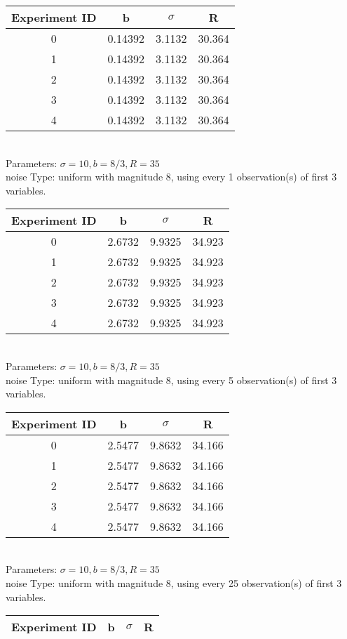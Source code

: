 \begin{multicols}{3}
\begin{tabular}{cccc}
\hline Experiment ID & b & $\sigma$ & R \\ \hline 
0 & 0.14392 & 3.1132 & 30.364\\ \hline 
 1 & 0.14392 & 3.1132 & 30.364\\ \hline 
 2 & 0.14392 & 3.1132 & 30.364\\ \hline 
 3 & 0.14392 & 3.1132 & 30.364\\ \hline 
 4 & 0.14392 & 3.1132 & 30.364\\ \hline 
 \end{tabular}\\
Parameters: $\sigma=10, b=8/3, R=35$\\
noise Type: uniform with magnitude 8, using every 1 observation(s) of first 3 variables.\\
\begin{tabular}{cccc}
\hline Experiment ID & b & $\sigma$ & R \\ \hline 
0 & 2.6732 & 9.9325 & 34.923\\ \hline 
 1 & 2.6732 & 9.9325 & 34.923\\ \hline 
 2 & 2.6732 & 9.9325 & 34.923\\ \hline 
 3 & 2.6732 & 9.9325 & 34.923\\ \hline 
 4 & 2.6732 & 9.9325 & 34.923\\ \hline 
 \end{tabular}\\
Parameters: $\sigma=10, b=8/3, R=35$\\
noise Type: uniform with magnitude 8, using every 5 observation(s) of first 3 variables.\\
\begin{tabular}{cccc}
\hline Experiment ID & b & $\sigma$ & R \\ \hline 
0 & 2.5477 & 9.8632 & 34.166\\ \hline 
 1 & 2.5477 & 9.8632 & 34.166\\ \hline 
 2 & 2.5477 & 9.8632 & 34.166\\ \hline 
 3 & 2.5477 & 9.8632 & 34.166\\ \hline 
 4 & 2.5477 & 9.8632 & 34.166\\ \hline 
 \end{tabular}\\
Parameters: $\sigma=10, b=8/3, R=35$\\
noise Type: uniform with magnitude 8, using every 25 observation(s) of first 3 variables.\\
\begin{tabular}{cccc}
\hline Experiment ID & b & $\sigma$ & R \\ \hline 

\end{tabular}
\end{multicols}
